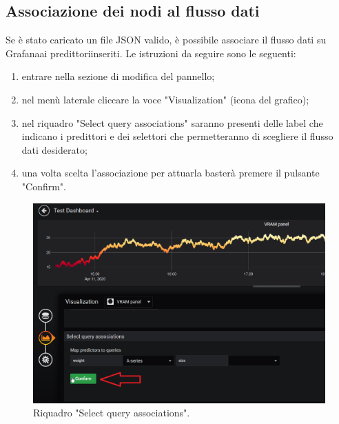     \subsection{Associazione dei nodi al flusso dati}
        Se è stato caricato un file JSON valido, è possibile associare il flusso dati su Grafana\glosp ai predittori\glosp inseriti. Le istruzioni da seguire sono le seguenti:
        \begin{enumerate}
            \item entrare nella sezione di modifica del pannello;
            \item nel menù laterale cliccare la voce "Visualization" (icona del grafico);
            \item nel riquadro "Select query associations" saranno presenti delle label che indicano i predittori e dei selettori che permetteranno di scegliere il flusso dati desiderato;
            \item una volta scelta l'associazione per attuarla basterà premere il pulsante "Confirm".
        \end{enumerate}
        \begin{figure}[H]
            \includegraphics[width=\textwidth,height=\textheight,keepaspectratio]{img/associazione_nodi.png}
            \caption{Riquadro "Select query associations".}
        \end{figure}
